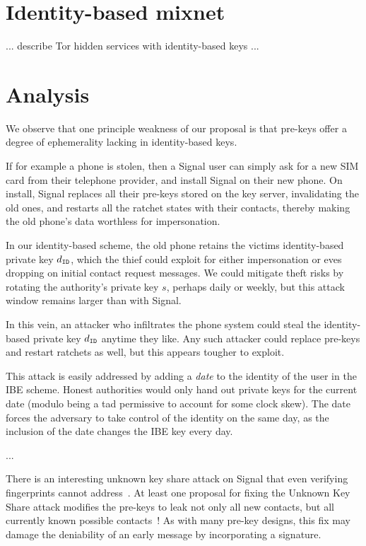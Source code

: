\documentclass[twoside,letterpaper]{sig-alternate}
\begin{document}
\section{Identity-based mixnet} %

... describe Tor hidden services with identity-based keys ...


\section{Analysis}

We observe that one principle weakness of our proposal is that pre-keys
offer a degree of ephemerality lacking in identity-based keys.

If for example a phone is stolen, then a Signal user can simply ask
for a new SIM card from their telephone provider, and install Signal
on their new phone.  On install, Signal replaces all their pre-keys
stored on the key server, invalidating the old ones, and restarts all
the ratchet states with their contacts, thereby making the old phone's
data worthless for impersonation.

In our identity-based scheme, the old phone retains the victims
identity-based private key $d_{\mathtt{ID}}$, which the thief could exploit for
either impersonation or eves dropping on initial contact request messages.
We could mitigate theft risks by rotating the authority's private key $s$,
perhaps daily or weekly, but this attack window remains larger than with Signal.

In this vein, an attacker who infiltrates the phone system could steal
the identity-based private key $d_{\mathtt{ID}}$ anytime they like.
Any such attacker could replace pre-keys and restart ratchets as well,
but this appears tougher to exploit.

This attack is easily addressed by adding a {\em date} to the
identity of the user in the IBE scheme.  Honest authorities would
only hand out private keys for the current date (modulo being
a tad permissive to account for some clock skew).  The date forces
the adversary to take control of the identity on the same day, as
the inclusion of the date changes the IBE key every day.

\smallskip


\smallskip

...

There is an interesting unknown key share attack on Signal that
even verifying fingerprints cannot address~\cite[\S4.2]{TextSecure}.
At least one proposal for fixing the Unknown Key Share attack
modifies the pre-keys to leak not only all new contacts, but
all currently known possible contacts~\cite[\S4.3]{TextSecure}!
As with many pre-key designs, this fix may damage the deniability
 of an early message by incorporating a signature.
\end{document}

